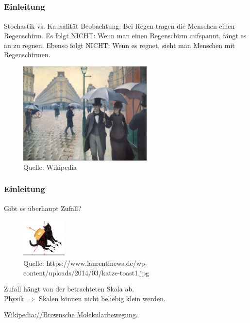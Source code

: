 \documentclass{beamer}
\begin{document}
\begin{frame}
    \frametitle{Einleitung}
\framesubtitle{}

    \begin{block}{Stochastik vs. Kausalität}
Beobachtung: Bei Regen tragen die Menschen einen Regenschirm.
Es folgt NICHT: Wenn man einen Regenschirm aufspannt, fängt es an zu regnen.
Ebenso folgt NICHT: Wenn es regnet, sieht man Menschen mit Regenschirmen. 
\end{block}


\begin{figure}[htp]
      \centering
    \includegraphics[width=0.6\textwidth]{img/Paris}

      \caption{Quelle: Wikipedia}
\end{figure}


\end{frame}




\begin{frame}
    \frametitle{Einleitung}
\framesubtitle{}
\begin{block}{}
Gibt es überhaupt Zufall? 
\end{block}

\begin{figure}[htp]
      \centering
    \includegraphics[width=0.2\textwidth]{img/katze-toast}

      \caption{Quelle: https://www.laurentinews.de/wp-content/uploads/2014/03/katze-toast1.jpg}
\end{figure}

    \begin{block}{}
Zufall hängt von der betrachteten Skala ab. \\
Physik $\Rightarrow$ Skalen können nicht beliebig klein werden.
\end{block}
    \begin{block}{}
\href{https://de.wikipedia.org/wiki/Brownsche_Bewegung
}{Wikipedia://Brownsche Molekularbewegung.
}
\end{block}

\end{frame}
\end{document}
